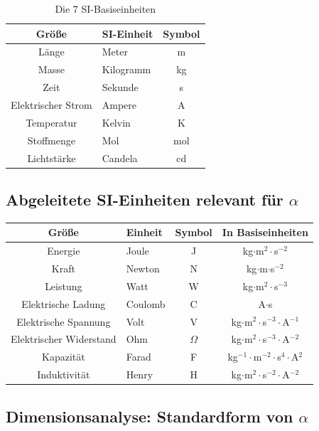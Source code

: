 	\begin{table}[h]
		\centering
		\begin{tabular}{|c|l|c|}
			\hline
			\textbf{Größe} & \textbf{SI-Einheit} & \textbf{Symbol} \\
			\hline
			Länge & Meter & m \\
			Masse & Kilogramm & kg \\
			Zeit & Sekunde & s \\
			Elektrischer Strom & Ampere & A \\
			Temperatur & Kelvin & K \\
			Stoffmenge & Mol & mol \\
			Lichtstärke & Candela & cd \\
			\hline
		\end{tabular}
		\caption{Die 7 SI-Basiseinheiten}
	\end{table}
	
	\subsection[Abgeleitete SI-Einheiten relevant fuer alpha]{Abgeleitete SI-Einheiten relevant für $\alpha$}
	
	\begin{longtable}{|c|l|c|c|}
		\hline
		\textbf{Größe} & \textbf{Einheit} & \textbf{Symbol} & \textbf{In Basiseinheiten} \\
		\hline
		Energie & Joule & J & kg$\cdot$m$^2\cdot$s$^{-2}$ \\
		Kraft & Newton & N & kg$\cdot$m$\cdot$s$^{-2}$ \\
		Leistung & Watt & W & kg$\cdot$m$^2\cdot$s$^{-3}$ \\
		Elektrische Ladung & Coulomb & C & A$\cdot$s \\
		Elektrische Spannung & Volt & V & kg$\cdot$m$^2\cdot$s$^{-3}\cdot$A$^{-1}$ \\
		Elektrischer Widerstand & Ohm & $\Omega$ & kg$\cdot$m$^2\cdot$s$^{-3}\cdot$A$^{-2}$ \\
		Kapazität & Farad & F & kg$^{-1}\cdot$m$^{-2}\cdot$s$^4\cdot$A$^2$ \\
		Induktivität & Henry & H & kg$\cdot$m$^2\cdot$s$^{-2}\cdot$A$^{-2}$ \\
		\hline
	\end{longtable}
	
	\subsection[Dimensionsanalyse: Standardform]{Dimensionsanalyse: Standardform von $\alpha$}
	
